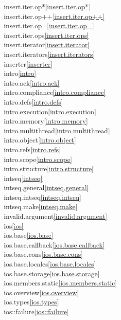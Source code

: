\begin{multicols}{2}
insert.iter.op*\quad\ref{insert.iter.op*}\\
insert.iter.op++\quad\ref{insert.iter.op++}\\
insert.iter.op=\quad\ref{insert.iter.op=}\\
insert.iter.ops\quad\ref{insert.iter.ops}\\
insert.iterator\quad\ref{insert.iterator}\\
insert.iterators\quad\ref{insert.iterators}\\
inserter\quad\ref{inserter}\\
intro\quad\ref{intro}\\
intro.ack\quad\ref{intro.ack}\\
intro.compliance\quad\ref{intro.compliance}\\
intro.defs\quad\ref{intro.defs}\\
intro.execution\quad\ref{intro.execution}\\
intro.memory\quad\ref{intro.memory}\\
intro.multithread\quad\ref{intro.multithread}\\
intro.object\quad\ref{intro.object}\\
intro.refs\quad\ref{intro.refs}\\
intro.scope\quad\ref{intro.scope}\\
intro.structure\quad\ref{intro.structure}\\
intseq\quad\ref{intseq}\\
intseq.general\quad\ref{intseq.general}\\
intseq.intseq\quad\ref{intseq.intseq}\\
intseq.make\quad\ref{intseq.make}\\
invalid.argument\quad\ref{invalid.argument}\\
ios\quad\ref{ios}\\
ios.base\quad\ref{ios.base}\\
ios.base.callback\quad\ref{ios.base.callback}\\
ios.base.cons\quad\ref{ios.base.cons}\\
ios.base.locales\quad\ref{ios.base.locales}\\
ios.base.storage\quad\ref{ios.base.storage}\\
ios.members.static\quad\ref{ios.members.static}\\
ios.overview\quad\ref{ios.overview}\\
ios.types\quad\ref{ios.types}\\
ios::failure\quad\ref{ios::failure}\\

\end{multicols}
